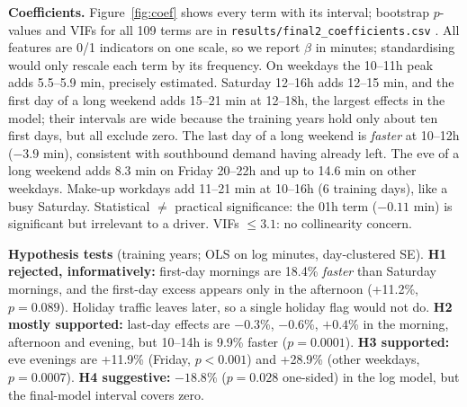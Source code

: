 \documentclass[11pt]{article}
\begin{document}
\textbf{Coefficients.} Figure~\ref{fig:coef} shows every term with its interval; bootstrap $p$-values and VIFs for all 109 terms are in \texttt{results/final2\_coefficients.csv} . All features are 0/1 indicators on one scale, so we report $\beta$ in minutes; standardising would only rescale each term by its frequency. On weekdays the 10--11h peak adds 5.5--5.9 min, precisely estimated. Saturday 12--16h adds 12--15 min, and the first day of a long weekend adds 15--21 min at 12--18h, the largest effects in the model; their intervals are wide because the training years hold only about ten first days, but all exclude zero. The last day of a long weekend is \emph{faster} at 10--12h ($-3.9$ min), consistent with southbound demand having already left. The eve of a long weekend adds 8.3 min on Friday 20--22h and up to 14.6 min on other weekdays. Make-up workdays add 11--21 min at 10--16h (6 training days), like a busy Saturday. Statistical $\neq$ practical significance: the 01h term ($-0.11$ min) is significant but irrelevant to a driver. VIFs $\le3.1$: no collinearity concern.

\noindent\textbf{Hypothesis tests} (training years; OLS on log minutes, day-clustered SE). \textbf{H1 rejected, informatively:} first-day mornings are 18.4\% \emph{faster} than Saturday mornings, and the first-day excess appears only in the afternoon (+11.2\%, $p{=}0.089$). Holiday traffic leaves later, so a single holiday flag would not do. \textbf{H2 mostly supported:} last-day effects are $-0.3$\%, $-0.6$\%, $+0.4$\% in the morning, afternoon and evening, but 10--14h is 9.9\% faster ($p=0.0001$). \textbf{H3 supported:} eve evenings are +11.9\% (Friday, $p<0.001$) and +28.9\% (other weekdays, $p=0.0007$). \textbf{H4 suggestive:} $-18.8\%$ ($p=0.028$ one-sided) in the log model, but the final-model interval covers zero.
\end{document}

